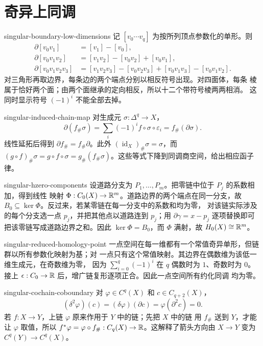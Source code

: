 \chapter{奇异上同调}

\begin{solution}{singular-boundary-low-dimensions}
记 $[v_0\cdots v_q]$ 为按所列顶点参数化的单形。则
\begin{align*}
 \partial[v_0v_1]&=[v_1]-[v_0],\\
 \partial[v_0v_1v_2]&=[v_1v_2]-[v_0v_2]+[v_0v_1],\\
 \partial[v_0v_1v_2v_3]&=[v_1v_2v_3]-[v_0v_2v_3]
 +[v_0v_1v_3]-[v_0v_1v_2].
\end{align*}
对三角形再取边界，每条边的两个端点分别以相反符号出现。对四面体，每条
棱属于恰好两个面；由两个面继承的定向相反，所以十二个带符号棱两两相消。
这同时显示符号 $(-1)^i$ 不能全部去掉。
\end{solution}

\begin{solution}{singular-induced-chain-map}
对生成元 $\sigma:\Delta^q\to X$，
\[
 \partial(f_\#\sigma)=\sum_i(-1)^if\circ\sigma\circ\varepsilon_i
 =f_\#(\partial\sigma).
\]
线性延拓后得到 $\partial f_\#=f_\#\partial$。此外
$(\operatorname{id}_X)_\#\sigma=\sigma$，而
$(g\circ f)_\#\sigma=g\circ f\circ\sigma
=g_\#(f_\#\sigma)$。这些等式下降到同调商空间，给出相应函子律。
\end{solution}

\begin{solution}{singular-hzero-components}
设道路分支为 $P_1,\ldots,P_m$。把零链中位于 $P_j$ 的系数相加，得到线性
映射 $\Phi:C_0(X)\to\mathbb{R}^m$。道路边界的两个端点在同一分支，故
$B_0\subseteq\ker\Phi$。反过来，若某零链在每一分支中的系数和均为零，
对该链实际涉及的每个分支选一点 $p_j$，并把其他点以道路连到 $p_j$；用
$\partial\gamma=x-p_j$ 逐项替换即可把该零链写成道路边界之和。因此
$\ker\Phi=B_0$，而 $\Phi$ 满射，故 $H_0(X)\cong\mathbb{R}^m$。
\end{solution}

\begin{solution}{singular-reduced-homology-point}
一点空间在每一维都有一个常值奇异单形，但链群以所有参数化映射为基；对
一点只有这个常值映射。其边界在偶数维为该低一维生成元，在奇数维为零，
因为 $\sum_{i=0}^q(-1)^i$ 在 $q$ 偶数时为 $1$、奇数时为 $0$。接上
$\epsilon:C_0\to\mathbb{R}$ 后，增广链复形逐项正合。因此一点空间所有约化同调
均为零。
\end{solution}

\begin{solution}{singular-cochain-coboundary}
对 $\varphi\in C^q(X)$ 和 $c\in C_{q+2}(X)$，
\[
 (\delta^2\varphi)(c)=(\delta\varphi)(\partial c)
 =\varphi(\partial^2c)=0.
\]
若 $f:X\to Y$，上链 $\varphi$ 原来作用于 $Y$ 中的链；先把 $X$ 中的链
用 $f_\#$ 送到 $Y$，才能让 $\varphi$ 取值，所以
$f^*\varphi=\varphi\circ f_\#:C_q(X)\to\mathbb{R}$。这解释了箭头方向由
$X\to Y$ 变为 $C^q(Y)\to C^q(X)$。
\end{solution}

